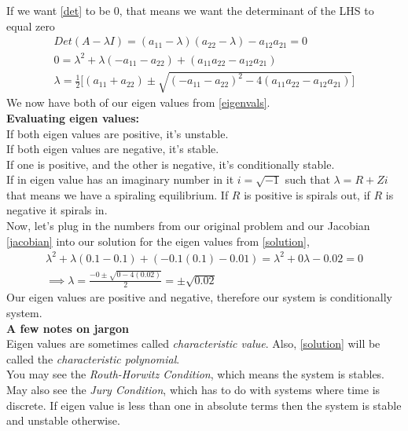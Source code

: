 \documentclass{article}
\begin{document}
If we want \ref{det} to be 0, that means we want the determinant of the LHS to equal zero 
\begin{align}
    Det(A - \lambda I) = (a_{11} - \lambda)(a_{22} - \lambda) - a_{12} a_{21} = 0 \\
    0 = \lambda^2 + \lambda (-a_{11} - a_{22}) + (a_{11}a_{22} - a_{12}a_{21}) \label{solution} \\
    \lambda = \frac{1}{2} \Bigg[(a_{11} + a_{22}) \pm \sqrt{(-a_{11} - a_{22})^2 - 4 (a_{11}a_{22} - a_{12} a_{21})}\Bigg] \label{eigenvals}
\end{align}
We now have both of our eigen values from \ref{eigenvals}. \\

\textbf{Evaluating eigen values:}\\
If both eigen values are positive, it's unstable. \\
If both eigen values are negative, it's stable. \\
If one is positive, and the other is negative, it's conditionally stable. \\
If in eigen value has an imaginary number in it $i = \sqrt{-1}$ such that $\lambda = R + Zi$ that means we have a spiraling equilibrium. If $R$ is positive is spirals out, if $R$ is negative it spirals in. \\

Now, let's plug in the numbers from our original problem and our Jacobian \ref{jacobian} into our solution for the eigen values from \ref{solution}, 
\begin{align}
    \lambda^2 + \lambda (0.1 - 0.1) + (-0.1(0.1) - 0.01) = \lambda^2 + 0 \lambda - 0.02 = 0 \\
    \implies \lambda = \frac{-0 \pm \sqrt{0 - 4(0.02)}}{2} = \pm \sqrt{0.02}
\end{align}
Our eigen values are positive and negative, therefore our system is conditionally system.\\ 

\textbf{A few notes on jargon}\\
Eigen values are sometimes called \textit{characteristic value}. Also, \ref{solution} will be called the \textit{characteristic polynomial}. \\

You may see the \textit{Routh-Horwitz Condition}, which means the system is stables. \\

May also see the \textit{Jury Condition}, which has to do with systems where time is discrete. If eigen value is less than one in absolute terms then the system is stable and unstable otherwise. \\
\end{document}
